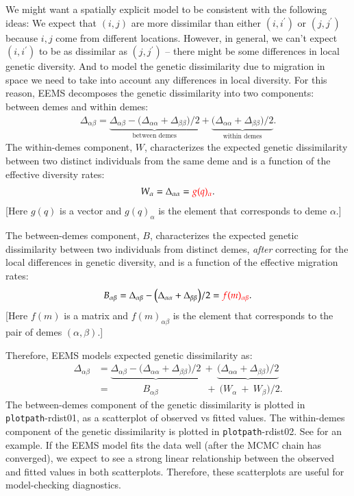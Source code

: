 \documentclass[a4paper,10pt,DIV=15,titlepage,mpinclude=true]{scrartcl}
\newcommand{\keystring}[1]{{\tt #1}}
\begin{document}
We might want a spatially explicit model to be consistent with the following ideas: We expect that $(i,j)$ are more dissimilar than either $(i,i^\prime)$ or $(j,j^\prime)$ because $i,j$ come from different locations. However, in general, we can't expect $(i,i^\prime)$ to be as dissimilar as $(j,j^\prime)$ -- there might be some differences in local genetic diversity. And to model the genetic dissimilarity due to migration in space we need to take into account any differences in local diversity. For this reason, EEMS decomposes the genetic dissimilarity into two components: between demes and within demes:
\begin{align}
\Delta_{\alpha\beta} = \underbrace{\Delta_{\alpha\beta} - \big(\Delta_{\alpha\alpha}+\Delta_{\beta\beta}\big)/2}_{\text{between demes}} + \underbrace{\big(\Delta_{\alpha\alpha}+\Delta_{\beta\beta}\big)/2}_{\text{within demes}}.
\end{align}
The within-demes component, $W$, characterizes the expected genetic dissimilarity between two distinct individuals from the same deme and is a function of the effective diversity rates:
\begin{align}
W_\alpha = \Delta_{\alpha\alpha} = {\color{red} g(q)_\alpha}.
\end{align}
[Here $g(q)$ is a vector and $g(q)_\alpha$ is the element that corresponds to deme $\alpha$.]

The between-demes component, $B$, characterizes the expected genetic dissimilarity between two individuals from distinct demes, \textit{after} correcting for the local differences in genetic diversity, and is a function of the effective migration rates: 
\begin{align}
B_{\alpha\beta} = \Delta_{\alpha\beta} - \big(\Delta_{\alpha\alpha}+\Delta_{\beta\beta}\big)/2 = {\color{red} f(m)_{\alpha\beta}}.
\end{align}
[Here $f(m)$ is a matrix and $f(m)_{\alpha\beta}$ is the element that corresponds to the pair of demes $(\alpha,\beta)$.]

Therefore, EEMS models expected genetic dissimilarity as:
\begin{align}
\Delta_{\alpha\beta} & = \underbrace{\Delta_{\alpha\beta} - \big(\Delta_{\alpha\alpha}+\Delta_{\beta\beta}\big)/2} ~+~ \underbrace{\big(\Delta_{\alpha\alpha}+\Delta_{\beta\beta}\big)/2}\\
&= \phantom{\Delta_{\alpha\beta} -\big(}B_{\alpha\beta}\phantom{\big(+\Delta_{\beta\beta}\big)/2} ~+~ \big(W_\alpha ~+~ W_\beta\big)/2.
\end{align}
The between-demes component of the genetic dissimilarity is plotted in \keystring{plotpath}-rdist01, as a scatterplot of observed vs fitted values. The within-demes component of the genetic dissimilarity is plotted in \keystring{plotpath}-rdist02. See  for an example. If the EEMS model fits the data well (after the MCMC chain has converged), we expect to see a strong linear relationship between the observed and fitted values in both scatterplots. Therefore, these scatterplots are useful for model-checking diagnostics.
\end{document}
